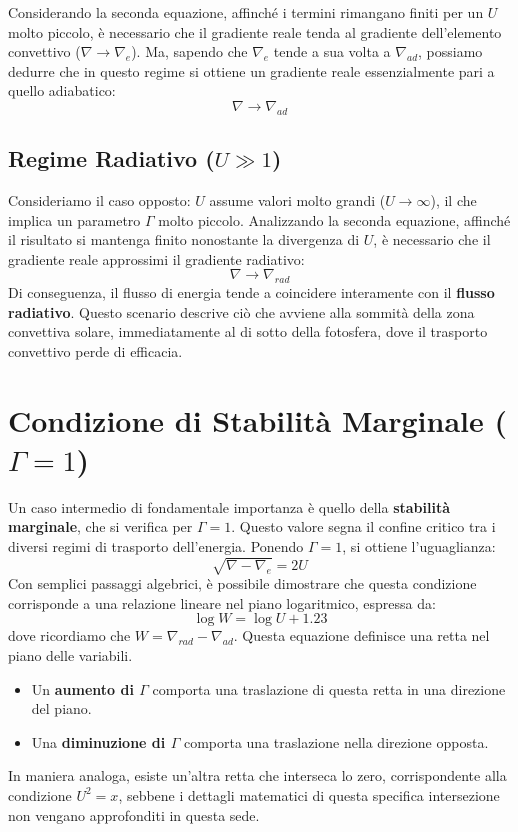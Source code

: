 Considerando la seconda equazione, affinché i termini rimangano finiti per un $U$ molto piccolo, è necessario che il gradiente reale tenda al gradiente dell'elemento convettivo ($\nabla \to \nabla_{e}$). Ma, sapendo che $\nabla_{e}$ tende a sua volta a $\nabla_{ad}$, possiamo dedurre che in questo regime si ottiene un gradiente reale essenzialmente pari a quello adiabatico:
\begin{equation}
\nabla \to \nabla_{ad}
\end{equation}

\subsection{Regime Radiativo ($U \gg 1$)}

Consideriamo il caso opposto: $U$ assume valori molto grandi ($U \to \infty$), il che implica un parametro $\Gamma$ molto piccolo.
Analizzando la seconda equazione, affinché il risultato si mantenga finito nonostante la divergenza di $U$, è necessario che il gradiente reale approssimi il gradiente radiativo:
\begin{equation}
\nabla \to \nabla_{rad}
\end{equation}
Di conseguenza, il flusso di energia tende a coincidere interamente con il \textbf{flusso radiativo}. Questo scenario descrive ciò che avviene alla sommità della zona convettiva solare, immediatamente al di sotto della fotosfera, dove il trasporto convettivo perde di efficacia.

\section{Condizione di Stabilità Marginale ($\Gamma = 1$)}

Un caso intermedio di fondamentale importanza è quello della \textbf{stabilità marginale}, che si verifica per $\Gamma = 1$. Questo valore segna il confine critico tra i diversi regimi di trasporto dell'energia.
Ponendo $\Gamma = 1$, si ottiene l'uguaglianza:
\begin{equation}
\sqrt{\nabla - \nabla_{e}} = 2U
\end{equation}
Con semplici passaggi algebrici, è possibile dimostrare che questa condizione corrisponde a una relazione lineare nel piano logaritmico, espressa da:
\begin{equation}
\log W = \log U + 1.23
\end{equation}
dove ricordiamo che $W = \nabla_{rad} - \nabla_{ad}$.
Questa equazione definisce una retta nel piano delle variabili.
\begin{itemize}
\item Un \textbf{aumento di $\Gamma$} comporta una traslazione di questa retta in una direzione del piano.
\item Una \textbf{diminuzione di $\Gamma$} comporta una traslazione nella direzione opposta.
\end{itemize}
In maniera analoga, esiste un'altra retta che interseca lo zero, corrispondente alla condizione $U^2 = x$, sebbene i dettagli matematici di questa specifica intersezione non vengano approfonditi in questa sede.

